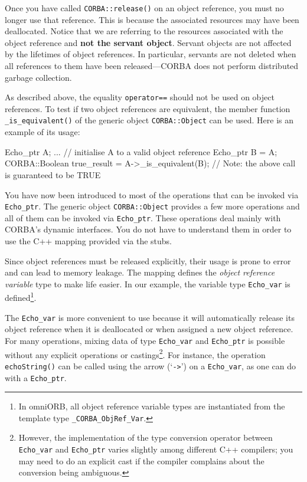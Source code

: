 \documentclass[11pt,twoside,a4paper]{book}
\newcommand{\type}[1]{\texttt{#1}}
\newcommand{\code}[1]{\texttt{#1}}
\newcommand{\op}[1]{\texttt{#1()}}
\newcommand{\term}[1]{\textit{#1}}
\begin{document}
Once you have called \op{CORBA::release} on an object reference, you
must no longer use that reference. This is because the associated
resources may have been deallocated. Notice that we are referring to
the resources associated with the object reference and \textbf{not the
servant object}. Servant objects are not affected by the lifetimes of
object references. In particular, servants are not deleted when all
references to them have been released---CORBA does not perform
distributed garbage collection.

As described above, the equality \code{operator==} should not be used
on object references. To test if two object references are equivalent,
the member function \op{\_is\_equivalent} of the generic object
\type{CORBA::Object} can be used. Here is an example of its usage:

\begin{cxxlisting}
Echo_ptr A;
...            // initialise A to a valid object reference 
Echo_ptr B = A;
CORBA::Boolean true_result = A->_is_equivalent(B); 
// Note: the above call is guaranteed to be TRUE
\end{cxxlisting}

You have now been introduced to most of the operations that can be
invoked via \type{Echo\_ptr}. The generic object \type{CORBA::Object}
provides a few more operations and all of them can be invoked via
\type{Echo\_ptr}. These operations deal mainly with CORBA's dynamic
interfaces. You do not have to understand them in order to use the C++
mapping provided via the stubs.

Since object references must be released explicitly, their usage is
prone to error and can lead to memory leakage. The mapping defines the
\term{object reference variable} type to make life easier. In our
example, the variable type \type{Echo\_var} is defined\footnote{In
omniORB, all object reference variable types are instantiated from the
template type \type{\_CORBA\_ObjRef\_Var}.}.

The \type{Echo\_var} is more convenient to use because it will
automatically release its object reference when it is deallocated or
when assigned a new object reference. For many operations, mixing data
of type \type{Echo\_var} and \type{Echo\_ptr} is possible without any
explicit operations or castings\footnote{However, the implementation
of the type conversion operator between \type{Echo\_var} and
\type{Echo\_ptr} varies slightly among different C++ compilers; you
may need to do an explicit cast if the compiler complains about the
conversion being ambiguous.}. For instance, the operation
\op{echoString} can be called using the arrow (`\code{->}') on a
\type{Echo\_var}, as one can do with a \type{Echo\_ptr}.
\end{document}
